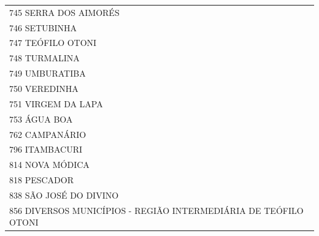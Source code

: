 \documentclass{article}
\begin{document}
\begin{longtable}[c]{m{18cm}}
\multicolumn{1}{l}{ \hspace{2em} 745 SERRA DOS AIMORÉS } \\
\multicolumn{1}{l}{ \hspace{2em} 746 SETUBINHA } \\
\multicolumn{1}{l}{ \hspace{2em} 747 TEÓFILO OTONI } \\
\multicolumn{1}{l}{ \hspace{2em} 748 TURMALINA } \\
\multicolumn{1}{l}{ \hspace{2em} 749 UMBURATIBA } \\
\multicolumn{1}{l}{ \hspace{2em} 750 VEREDINHA } \\
\multicolumn{1}{l}{ \hspace{2em} 751 VIRGEM DA LAPA } \\
\multicolumn{1}{l}{ \hspace{2em} 753 ÁGUA BOA } \\
\multicolumn{1}{l}{ \hspace{2em} 762 CAMPANÁRIO } \\
\multicolumn{1}{l}{ \hspace{2em} 796 ITAMBACURI } \\
\multicolumn{1}{l}{ \hspace{2em} 814 NOVA MÓDICA } \\
\multicolumn{1}{l}{ \hspace{2em} 818 PESCADOR } \\
\multicolumn{1}{l}{ \hspace{2em} 838 SÃO JOSÉ DO DIVINO } \\
\multicolumn{1}{l}{ \hspace{2em} 856 DIVERSOS MUNICÍPIOS - REGIÃO INTERMEDIÁRIA DE TEÓFILO OTONI } \\
\end{longtable}
\newpage
\end{document}
